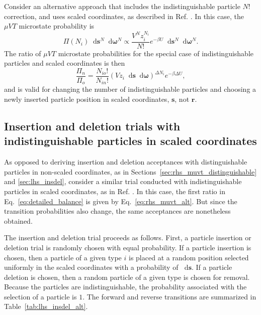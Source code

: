 \documentclass[
  9pt,
  bestpractices,
]{livecoms}
\newcommand*\diff{\mathop{}\!\mathrm{d}}
\begin{document}
Consider an alternative approach that includes the indistinguishable particle $N!$ correction, and uses scaled coordinates, as described in Ref. \cite{frenkel_understanding_2002}.
In this case, the $\mu VT$ microstate probability is
\begin{equation}
\Pi(N_i)\diff\mathbf{s}^{N}\diff\boldsymbol{\omega}^{N} \propto \frac{V^{N}z_i^{N_i}}{N!} e^{-\beta U} \diff\mathbf{s}^{N}\diff\boldsymbol{\omega}^{N}.
\end{equation}
The ratio of $\mu VT$ microstate probabilities for the special case of indistinguishable particles and scaled coordinates is then
\begin{equation}
\frac{\Pi_n}{\Pi_o} = \frac{N_{io}!}{N_{in}!}\left(V z_i\diff\mathbf{s}\diff\boldsymbol{\omega}\right)^{\Delta N_i}e^{-\beta\Delta U},
\label{eq:rhs_muvt_alt}
\end{equation}
and is valid for changing the number of indistinguishable particles and choosing a newly inserted particle position in scaled coordinates, $\mathbf{s}$, not $\mathbf{r}$.


\subsection{\label{sec:lhs_insdel_alt}Insertion and deletion trials with indistinguishable particles in scaled coordinates}

As opposed to deriving insertion and deletion acceptances with distinguishable particles in non-scaled coordinates, as in Sections~\ref{sec:rhs_muvt_distinguishable} and \ref{sec:lhs_insdel}, consider a similar trial conducted with indistinguishable particles in scaled coordinates, as in Ref. \cite{frenkel_understanding_2002}.
In this case, the first ratio in Eq.~\ref{eq:detailed_balance} is given by Eq.~\ref{eq:rhs_muvt_alt}.
But since the transition probabilities also change, the same acceptances are nonetheless obtained.

The insertion and deletion trial proceeds as follows.
First, a particle insertion or deletion trial is randomly chosen with equal probability.
If a particle insertion is chosen, then a particle of a given type $i$ is placed at a random position selected uniformly in the scaled coordinates with a probability of $\diff\mathbf{s}$.
If a particle deletion is chosen, then a random particle of a given type is chosen for removal.
Because the particles are indistinguishable, the probability associated with the selection of a particle is $1$.
The forward and reverse transitions are summarized in Table~\ref{tab:lhs_insdel_alt}.
\end{document}
